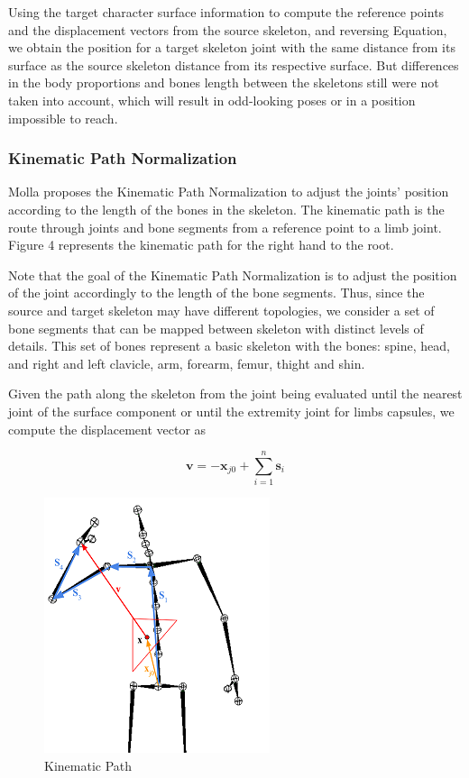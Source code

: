 \documentclass{vgtc}
\makeatletter
\def\maxwidth{\ifdim\Gin@nat@width>\linewidth\linewidth
    \else\Gin@nat@width\fi}
\let\Oldincludegraphics\includegraphics
\renewcommand{\includegraphics}[1]{\Oldincludegraphics[width=.8\maxwidth]{#1}}
\makeatother
\begin{document}
Using the target character surface information to compute the reference
points and the displacement vectors from the source skeleton, and
reversing Equation, we obtain the position for a target skeleton joint
with the same distance from its surface as the source skeleton distance
from its respective surface. But differences in the body proportions and
bones length between the skeletons still were not taken into account,
which will result in odd-looking poses or in a position impossible to
reach.


    \subsubsection{Kinematic Path
Normalization}\label{kinematic-path-normalization}

Molla proposes the Kinematic Path Normalization to adjust the joints'
position according to the length of the bones in the skeleton. The
kinematic path is the route through joints and bone segments from a
reference point to a limb joint. Figure 4 represents the kinematic path
for the right hand to the root.

Note that the goal of the Kinematic Path Normalization is to adjust the
position of the joint accordingly to the length of the bone segments.
Thus, since the source and target skeleton may have different
topologies, we consider a set of bone segments that can be mapped
between skeleton with distinct levels of details. This set of bones
represent a basic skeleton with the bones: spine, head, and right and
left clavicle, arm, forearm, femur, thight and shin.

Given the path along the skeleton from the joint being evaluated until
the nearest joint of the surface component or until the extremity joint
for limbs capsules, we compute the displacement vector as

\begin{equation}
\label{eq:dispvector}
\mathbf{v} = \mathbf{-x}_{j0} + \sum_{i=1}^{n} \mathbf{s}_i
\end{equation}

\begin{figure}
\centering
\includegraphics{../figures/SkeletonKinematicPath.png}
\caption{Kinematic Path}
\end{figure}
\end{document}
